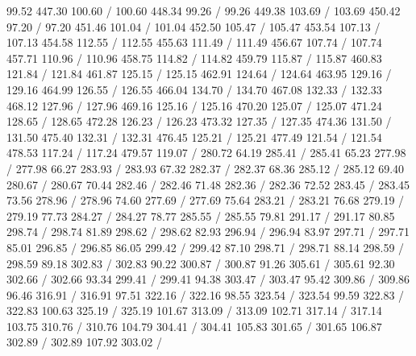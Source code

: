 { 99.52 447.30 100.60 /
 100.60 448.34 99.26 /
 99.26 449.38 103.69 /
 103.69 450.42 97.20 /
 97.20 451.46 101.04 /
 101.04 452.50 105.47 /
 105.47 453.54 107.13 /
 107.13 454.58 112.55 /
 112.55 455.63 111.49 /
 111.49 456.67 107.74 /
 107.74 457.71 110.96 /
 110.96 458.75 114.82 /
 114.82 459.79 115.87 /
 115.87 460.83 121.84 /
 121.84 461.87 125.15 /
 125.15 462.91 124.64 /
 124.64 463.95 129.16 /
 129.16 464.99 126.55 /
 126.55 466.04 134.70 /
 134.70 467.08 132.33 /
 132.33 468.12 127.96 /
 127.96 469.16 125.16 /
 125.16 470.20 125.07 /
 125.07 471.24 128.65 /
 128.65 472.28 126.23 /
 126.23 473.32 127.35 /
 127.35 474.36 131.50 /
 131.50 475.40 132.31 /
 132.31 476.45 125.21 /
 125.21 477.49 121.54 /
 121.54 478.53 117.24 /
 117.24 479.57 119.07 /
\setsolid
{} 280.72 64.19 285.41 /
 285.41 65.23 277.98 /
 277.98 66.27 283.93 /
 283.93 67.32 282.37 /
 282.37 68.36 285.12 /
 285.12 69.40 280.67 /
 280.67 70.44 282.46 /
 282.46 71.48 282.36 /
 282.36 72.52 283.45 /
 283.45 73.56 278.96 /
 278.96 74.60 277.69 /
 277.69 75.64 283.21 /
 283.21 76.68 279.19 /
 279.19 77.73 284.27 /
 284.27 78.77 285.55 /
 285.55 79.81 291.17 /
 291.17 80.85 298.74 /
 298.74 81.89 298.62 /
 298.62 82.93 296.94 /
 296.94 83.97 297.71 /
 297.71 85.01 296.85 /
 296.85 86.05 299.42 /
 299.42 87.10 298.71 /
 298.71 88.14 298.59 /
 298.59 89.18 302.83 /
 302.83 90.22 300.87 /
 300.87 91.26 305.61 /
 305.61 92.30 302.66 /
 302.66 93.34 299.41 /
 299.41 94.38 303.47 /
 303.47 95.42 309.86 /
 309.86 96.46 316.91 /
 316.91 97.51 322.16 /
 322.16 98.55 323.54 /
 323.54 99.59 322.83 /
 322.83 100.63 325.19 /
 325.19 101.67 313.09 /
 313.09 102.71 317.14 /
 317.14 103.75 310.76 /
 310.76 104.79 304.41 /
 304.41 105.83 301.65 /
 301.65 106.87 302.89 /
 302.89 107.92 303.02 /
}

